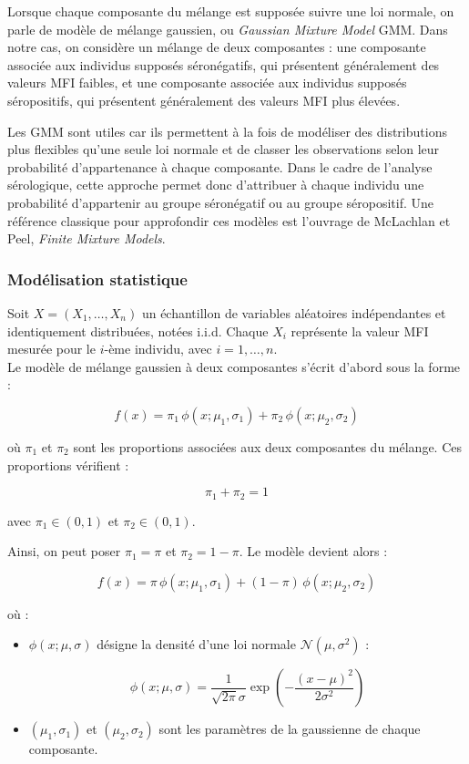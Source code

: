 \documentclass[a4paper]{article}
\begin{document}
Lorsque chaque composante du mélange est supposée suivre une loi normale, on parle de modèle de mélange gaussien, ou \textit{Gaussian Mixture Model} GMM. Dans notre cas, on considère un mélange de deux composantes : une composante associée aux individus supposés séronégatifs, qui présentent généralement des valeurs MFI faibles, et une composante associée aux individus supposés séropositifs, qui présentent généralement des valeurs MFI plus élevées.

Les GMM sont utiles car ils permettent à la fois de modéliser des distributions plus flexibles qu’une seule loi normale et de classer les observations selon leur probabilité d’appartenance à chaque composante. Dans le cadre de l’analyse sérologique, cette approche permet donc d’attribuer à chaque individu une probabilité d’appartenir au groupe séronégatif ou au groupe séropositif. Une référence classique pour approfondir ces modèles est l’ouvrage de McLachlan et Peel, \textit{Finite Mixture Models}.

\newpage 

\subsubsection{Modélisation statistique}

Soit \(X = (X_1, \ldots, X_n)\) un échantillon de variables aléatoires indépendantes et identiquement distribuées, notées i.i.d. Chaque \(X_i\) représente la valeur MFI mesurée pour le \(i\)-ème individu, avec \(i = 1,\ldots,n\).\\
Le modèle de mélange gaussien à deux composantes s'écrit d'abord sous la forme :

\[
f(x) = \pi_1 \, \phi(x;\mu_1,\sigma_1) + \pi_2 \, \phi(x;\mu_2,\sigma_2)
\]

où \(\pi_1\) et \(\pi_2\) sont les proportions associées aux deux composantes du mélange. Ces proportions vérifient :

\[
\pi_1 + \pi_2 = 1
\]

avec \(\pi_1 \in (0,1)\) et \(\pi_2 \in (0,1)\).

Ainsi, on peut poser \(\pi_1 = \pi\) et \(\pi_2 = 1-\pi\). Le modèle devient alors :

\[
f(x) = \pi \, \phi(x;\mu_1,\sigma_1) + (1-\pi) \, \phi(x;\mu_2,\sigma_2)
\]

où :
\begin{itemize}
    \item \(\phi(x;\mu,\sigma)\) désigne la densité d'une loi normale \(\mathcal{N}(\mu,\sigma^2)\) :

    \[
    \phi(x;\mu,\sigma) =
    \frac{1}{\sqrt{2\pi}\sigma}
    \exp\left(
    -\frac{(x-\mu)^2}{2\sigma^2}
    \right)
    \]
    \item $(\mu_1,\sigma_1)$ et $(\mu_2,\sigma_2)$ sont les paramètres de la gaussienne de chaque composante. \\
\end{itemize}
\end{document}

